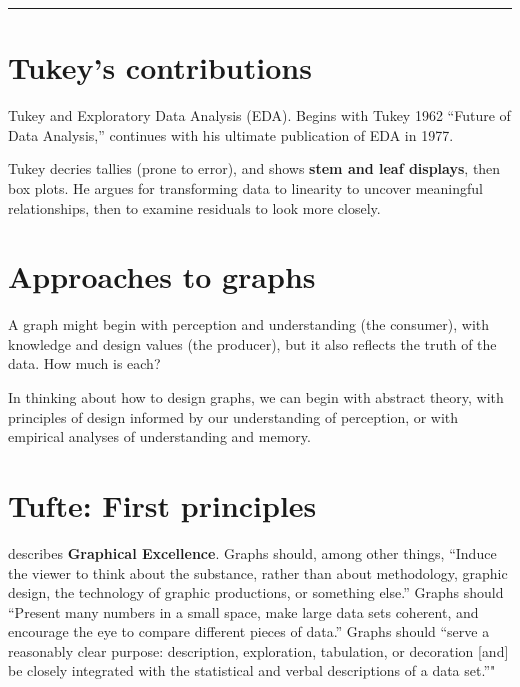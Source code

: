 \documentclass[openany]{book}
\begin{document}
\begin{center}\rule{0.5\linewidth}{\linethickness}\end{center}

\hypertarget{tukeys-contributions}{%
\section{Tukey's contributions}\label{tukeys-contributions}}

Tukey and Exploratory Data Analysis (EDA). Begins with Tukey 1962 ``Future of Data Analysis,'' continues with his ultimate publication of EDA in 1977.

Tukey decries tallies (prone to error), and shows \textbf{stem and leaf displays}, then box plots. He argues for transforming data to linearity to uncover meaningful relationships, then to examine residuals to look more closely.

\hypertarget{approaches-to-graphs}{%
\section{Approaches to graphs}\label{approaches-to-graphs}}

A graph might begin with perception and understanding (the consumer), with knowledge and design values (the producer), but it also reflects the truth of the data. How much is each?

In thinking about how to design graphs, we can begin with abstract theory, with principles of design informed by our understanding of perception, or with empirical analyses of understanding and memory.

\hypertarget{tufte-first-principles}{%
\section{Tufte: First principles}\label{tufte-first-principles}}

\citet{tufte2001visual} describes \textbf{Graphical Excellence}. Graphs should, among other things, ``Induce the viewer to think about the substance, rather than about methodology, graphic design, the technology of graphic productions, or something else.'' Graphs should ``Present many numbers in a small space, make large data sets coherent, and encourage the eye to compare different pieces of data.'' Graphs should ``serve a reasonably clear purpose: description, exploration, tabulation, or decoration {[}and{]} be closely integrated with the statistical and verbal descriptions of a data set.''"
\end{document}
